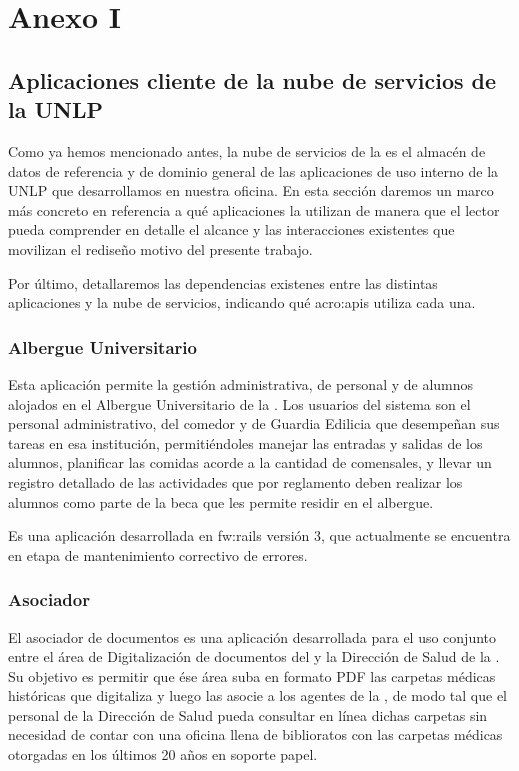 \section{Anexo I}
\label{anexo:detalle-clientes}

\subsection{Aplicaciones cliente de la nube de servicios de la UNLP}

Como ya hemos mencionado antes, la nube de servicios de la {\unlp} es el almacén de datos de referencia y de dominio general de las aplicaciones de uso interno de la UNLP que desarrollamos en nuestra oficina. En esta sección daremos un marco más concreto en referencia a qué aplicaciones la utilizan de manera que el lector pueda comprender en detalle el alcance y las interacciones existentes que movilizan el rediseño motivo del presente trabajo.

Por último, detallaremos las dependencias existenes entre las distintas aplicaciones y la nube de servicios, indicando qué \glspl{acro:api} utiliza cada una.


\subsubsection{Albergue Universitario}
\label{anexo:detalle-clientes:albergue}

Esta aplicación permite la gestión administrativa, de personal y de alumnos alojados en el Albergue Universitario de la {\unlp}. Los usuarios del sistema son el personal administrativo, del comedor y de Guardia Edilicia que desempeñan sus tareas en esa institución, permitiéndoles manejar las entradas y salidas de los alumnos, planificar las comidas acorde a la cantidad de comensales, y llevar un registro detallado de las actividades que por reglamento deben realizar los alumnos como parte de la beca que les permite residir en el albergue.

Es una aplicación desarrollada en \gls{fw:rails} versión 3, que actualmente se encuentra en etapa de mantenimiento correctivo de errores.


\subsubsection{Asociador}
\label{anexo:detalle-clientes:asociador}

El asociador de documentos es una aplicación desarrollada para el uso conjunto entre el área de Digitalización de documentos del {\cespi} y la Dirección de Salud de la {\unlp}. Su objetivo es permitir que ése área suba en formato PDF las carpetas médicas históricas que digitaliza y luego las asocie a los agentes de la {\unlp}, de modo tal que el personal de la Dirección de Salud pueda consultar en línea dichas carpetas sin necesidad de contar con una oficina llena de biblioratos con las carpetas médicas otorgadas en los últimos 20 años en soporte papel.

